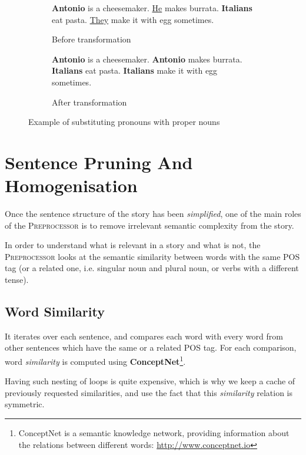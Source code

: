 \begin{figure}[H]
\begin{subfigure}{\textwidth}
\begin{displayquote}
\textbf{Antonio} is a cheesemaker. \underline{He} makes burrata.
\textbf{Italians} eat pasta. \underline{They} make it with egg sometimes.
\end{displayquote}
\caption{Before transformation}
\vspace{\baselineskip}
\end{subfigure}
\begin{subfigure}{\textwidth}
\begin{displayquote}
\textbf{Antonio} is a cheesemaker. \textbf{Antonio} makes burrata.
\textbf{Italians} eat pasta. \textbf{Italians} make it with egg sometimes.
\caption{After transformation}
\end{displayquote}
\end{subfigure}
\caption{Example of substituting pronouns with proper nouns}
\label{fig:pronoun_substitution}
\end{figure}

\section{Sentence Pruning And Homogenisation}
\label{sec:pruning_homogenisation}

Once the sentence structure of the story has been \textit{simplified}, one of the main roles of the \textsc{Preprocessor} is to remove irrelevant semantic complexity from the story.

In order to understand what is relevant in a story and what is not, the \textsc{Preprocessor} looks at the semantic similarity between words with the same POS tag (or a related one, i.e. singular noun and plural noun, or verbs with a different tense).

\subsection{Word Similarity}

It iterates over each sentence, and compares each word with every word from other sentences which have the same or a related POS tag. For each comparison, word \textit{similarity} is computed using \textbf{ConceptNet}\footnote{ConceptNet is a semantic knowledge network, providing information about the relations between different words: \url{http://www.conceptnet.io}}.

Having such nesting of loops is quite expensive, which is why we keep a cache of previously requested similarities, and use the fact that this \textit{similarity} relation is symmetric.


